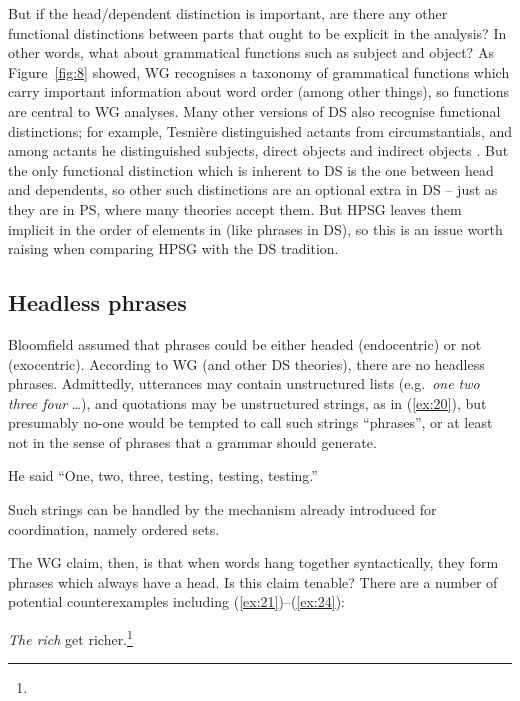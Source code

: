 \documentclass[output=paper,biblatex,babelshorthands,newtxmath,draftmode,colorlinks,citecolor=brown]{langscibook}
\begin{document}
But if the head/dependent distinction is important, are there any other functional distinctions between parts that ought to be explicit in the analysis? In other words, what about grammatical functions such as subject and object? As Figure~\ref{fig:8} showed, WG recognises a taxonomy of grammatical functions which carry important information about word order (among other things), so functions are central to WG analyses. Many other versions of DS also recognise functional distinctions; for example, Tesnière distinguished actants from circumstantials, and among actants he distinguished subjects, direct objects and indirect objects \citep[xlvii]{Tesniere2015a-u}. But the only functional distinction which is inherent to DS is the one between head and dependents, so other such distinctions are an optional extra in DS – just as they are in PS, where many theories accept them. But HPSG leaves them implicit in the order of elements in \argst (like phrases in DS), so this is an issue worth raising when comparing HPSG with the DS tradition.


\subsection{Headless phrases}
\label{sec:5.1}

Bloomfield assumed that phrases could be either headed (endocentric) or not (exocentric). According to WG (and other DS theories), there are no headless phrases. Admittedly, utterances may contain unstructured lists (e.g.\ \emph{one two three four} \dots), and quotations may be unstructured strings, as in (\ref{ex:20}), but presumably no-one would be tempted to call such strings ``phrases'', or at least not in the sense of phrases that a grammar should generate.

\begin{exe}
	\ex \label{ex:20} He said ``One, two, three, testing, testing, testing.''
\end{exe}
%
Such strings can be handled by the mechanism already introduced for coordination, namely ordered sets.

The WG claim, then, is that when words hang together syntactically, they form phrases which always
have a head. Is this claim tenable? There are a number of potential counterexamples including
(\ref{ex:21})--(\ref{ex:24}):

\settowidth{}
\eal
\ex \label{ex:21} \emph{The rich} get richer.\footnote{}
\end{document}

